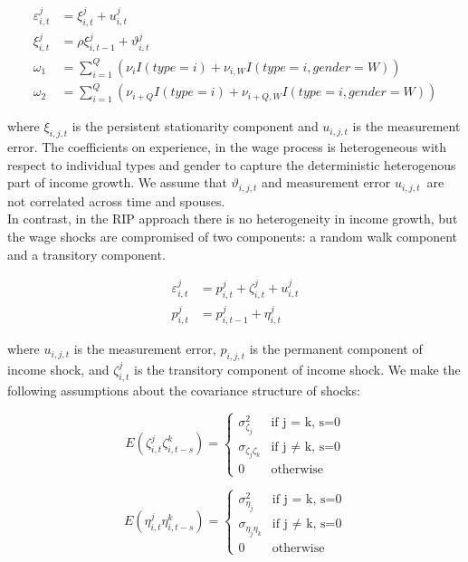 \begin{align*}
\varepsilon^j_{i,t} & = \xi^j_{i,t} + u^j_{i,t}\\
\xi^j_{i,t} &= \rho \xi^j_{i,t-1} + \vartheta^j_{i,t} \\
\omega_1 &=  \sum \limits_{i=1}^{Q} \left( \nu_{i} I(type =i) + \nu_{i,W}  I(type = i, gender = W)\right ) \\
\omega_2 &=  \sum \limits_{i=1}^{Q} \left( \nu_{i+Q} I(type =i) + \nu_{i+Q,W}  I(type = i, gender = W)\right )
\end{align*}

where $\xi_{i,j,t}$ is the persistent stationarity component and $u_{i,j,t}$ is the measurement error. The coefficients on experience, in the wage process is heterogeneous with respect to individual types and gender to capture the deterministic heterogenous part of income growth.  We assume that $\vartheta_{i,j,t}$ and measurement error $u_{i,j,t}$\ are not correlated across time and spouses.\\

In contrast, in the RIP approach there is no heterogeneity in income growth, but the wage shocks are compromised of two components: a random walk component and a transitory component. 

\begin{align*}
\varepsilon^j_{i,t} &= p^j_{i,t} + \zeta^j_{i,t} + u^j_{i,t} \\
p^j_{i,t} &= p^j_{i,t-1} + \eta^j_{i,t}
\end{align*} 

where $u_{i,j,t}$ is the measurement error, $p_{i,j,t}$ is the permanent component of income shock, and $\zeta^j_{i,t}$ is the transitory component of income shock. We make the following assumptions about the covariance structure of shocks:

\begin{equation*}
E(\zeta^j_{i,t} \zeta^k_{i,t-s}) =
 \begin{cases}
\sigma^2_{\zeta_j} & \mbox{if j = k, s=0} \\
\sigma_{\zeta_j \zeta_k} & \mbox{if j $\neq$ k, s=0} \\
0 & \mbox{otherwise}
\end{cases}
\end{equation*}

\begin{equation*}
E(\eta^j_{i,t} \eta^k_{i,t-s}) = 
 \begin{cases}
\sigma^2_{\eta_j} & \mbox{if j = k, s=0} \\
\sigma_{\eta_j \eta_k} & \mbox{if j $\neq$ k, s=0} \\
0 & \mbox{otherwise}
\end{cases}
\end{equation*}


